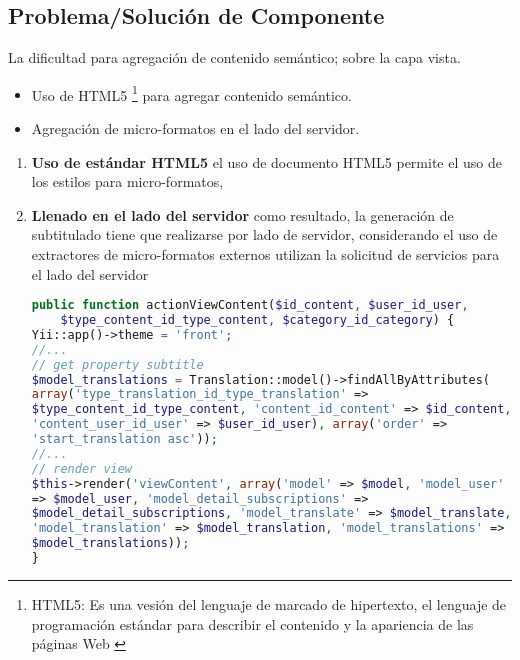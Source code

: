 \subsection{Problema/Solución de Componente}

La dificultad para agregación de contenido semántico; sobre la capa vista.

\begin{itemize}

\item Uso de HTML5 \footnote{HTML5: Es una vesi\'{o}n del lenguaje de marcado
de hipertexto, el lenguaje de programación estándar para describir el
contenido y la apariencia de las páginas Web \cite{html5}}  para agregar 
contenido semántico.
\item Agregación de micro-formatos en el lado del servidor.

\end{itemize}

\begin{enumerate}

\item \textbf{Uso de estándar HTML5} el uso de documento HTML5 permite el
uso de los estilos para micro-formatos, 

\item \textbf{Llenado en el lado del servidor} como resultado, la generación
de subtitulado tiene que realizarse por lado de servidor, considerando el uso
de extractores de micro-formatos externos utilizan la solicitud de servicios
para el lado del servidor  

\begin{lstlisting}[language = PHP, caption={Acción de obtención y envió para vista.}]
public function actionViewContent($id_content, $user_id_user, 
    $type_content_id_type_content, $category_id_category) {
Yii::app()->theme = 'front';
//...
// get property subtitle
$model_translations = Translation::model()->findAllByAttributes(
array('type_translation_id_type_translation' => 
$type_content_id_type_content, 'content_id_content' => $id_content,
'content_user_id_user' => $user_id_user), array('order' => 
'start_translation asc'));
//...
// render view
$this->render('viewContent', array('model' => $model, 'model_user'
=> $model_user, 'model_detail_subscriptions' => 
$model_detail_subscriptions, 'model_translate' => $model_translate,
'model_translation' => $model_translation, 'model_translations' => 
$model_translations));
}
\end{lstlisting}

\end{enumerate}

